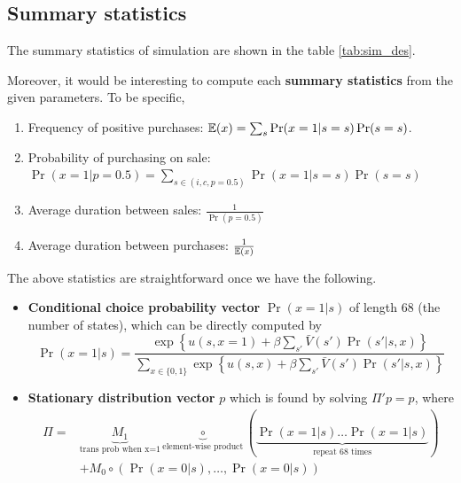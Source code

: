 \documentclass[12pt]{article}[margin=1in]
\begin{document}
\subsection{Summary statistics}
The summary statistics of simulation are shown in the table \ref{tab:sim_des}.
\begin{table}[h]
    \centering
    \begin{minipage}{0.45\textwidth}
        \fontsize{8pt}{10pt}\selectfont
        \centering
        
        \label{tab:sim_des}
    \end{minipage}%
    \hspace{0.05\textwidth} %
    \begin{minipage}{0.45\textwidth}\fontsize{8pt}{10pt}\selectfont
        \centering
        
        \label{tab:theo_des}
    \end{minipage}
\end{table}
Moreover, it would be interesting to compute each \textbf{summary statistics}
from the given parameters. To be specific,
\begin{enumerate}
    \item Frequency of positive purchases: $\mathbb{E}(x)=\sum_s\Pr(x=1|s=s)\Pr(s=s)$.
    \item Probability of purchasing on sale: $\Pr(x=1|p=0.5)=\sum_{s\in (i,c,p=0.5)}
              \Pr(x=1|s=s)\Pr(s=s)$
    \item Average duration between sales: $\frac{1}{\Pr(p=0.5)}$
    \item Average duration between purchases: $\frac{1}{\mathbb{E}(x)}$
\end{enumerate}
The above statistics are straightforward once we have the following.
\begin{itemize}
    \item \textbf{Conditional choice probability vector} $\Pr(x=1|s)$ of length 68 (the number of states),
          which can be directly computed by
          \begin{equation*}
              \Pr(x=1|s)=\frac{\exp\left\{ u(s,x=1) + \beta \sum_{s'}\bar{V}(s') \Pr(s'|s,x)\right\}}{\sum_{x \in \{0,1\}} \exp\left\{ u(s,x) + \beta \sum_{s'}\bar{V}(s') \Pr(s'|s,x)\right\}}
          \end{equation*}
    \item \textbf{Stationary distribution vector} $p$ which is found by solving $\Pi' p = p$, where
          \begin{equation*}
              \begin{split}
                  \Pi = & \underbrace{M_1}_{\text{trans prob when x=1}} \underbrace{\circ}_{\text{element-wise product}} (\underbrace{\Pr(x=1|s) \ldots \Pr(x=1|s)}_{\text{repeat 68 times}}) \\
                        & + M_0 \circ (\Pr(x=0|s),\ldots,\Pr(x=0|s))
              \end{split}
          \end{equation*}
\end{itemize}
\end{document}
